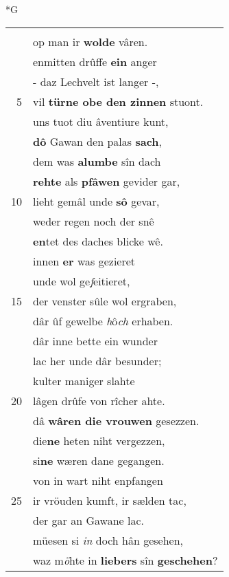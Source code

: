\documentclass[8pt,a4paper,notitlepage]{article}
\begin{document}
\begin{table}[ht]
\begin{minipage}[t]{0.5\linewidth}
\small
\begin{center}*G
\end{center}
\begin{tabular}{rl}
 & \textbf{\begin{large}G\end{large}æben} si ze drîzec jâren,\\ 
 & op man ir \textbf{wolde} vâren.\\ 
 & enmitten drûffe \textbf{ein} anger\\ 
 & - daz Lechvelt ist langer -,\\ 
5 & vil \textbf{türne obe den zinnen} stuont.\\ 
 & uns tuot diu âventiure kunt,\\ 
 & \textbf{dô} Gawan den palas \textbf{sach},\\ 
 & dem was \textbf{alumbe} sîn dach\\ 
 & \textbf{rehte} als \textbf{pfâwen} gevider gar,\\ 
10 & lieht gemâl unde \textbf{sô} gevar,\\ 
 & weder regen noch der snê\\ 
 & \textbf{en}tet des daches blicke wê.\\ 
 & innen \textbf{er} was gezieret\\ 
 & unde wol ge\textit{f}eitieret,\\ 
15 & der venster sûle wol ergraben,\\ 
 & dâr ûf gewelbe \textit{h}ô\textit{ch} erhaben.\\ 
 & dâr inne bette ein wunder\\ 
 & lac her unde dâr besunder;\\ 
 & kulter maniger slahte\\ 
20 & lâgen drûfe von rîcher ahte.\\ 
 & dâ \textbf{wâren die vrouwen} gesezzen.\\ 
 & die\textbf{ne} heten niht vergezzen,\\ 
 & si\textbf{ne} wæren dane gegangen.\\ 
 & von in wart niht enpfangen\\ 
25 & ir vröuden kumft, ir sælden tac,\\ 
 & der gar an Gawane lac.\\ 
 & müesen si \textit{in} doch hân gesehen,\\ 
 & waz m\textit{ö}hte in \textbf{liebers} sîn \textbf{geschehen}?\\ 

\end{tabular}
\end{minipage}
\end{table}
\end{document}
